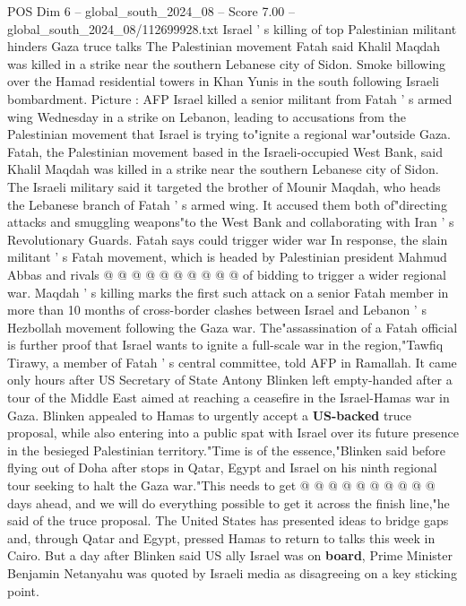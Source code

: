 \begin{textsample}{POS Dim 6 – global\_south\_2024\_08 – Score 7.00 – global\_south\_2024\_08/112699928.txt}  \label{ex:f6_pos_381}
Israel ' s killing of top Palestinian militant hinders Gaza truce talks The Palestinian movement Fatah said Khalil Maqdah was killed in a strike near the southern Lebanese city of Sidon.
Smoke billowing over the Hamad residential towers in Khan Yunis in the south following Israeli bombardment.
Picture : AFP Israel killed a senior militant from Fatah ' s armed wing Wednesday in a strike on Lebanon, leading to accusations from the Palestinian movement that Israel is trying to"ignite a regional war"outside Gaza.
Fatah, the Palestinian movement based in the Israeli-occupied West Bank, said Khalil Maqdah was killed in a strike near the southern Lebanese city of Sidon.
The Israeli military said it targeted the brother of Mounir Maqdah, who heads the Lebanese branch of Fatah ' s armed wing.
It accused them both of"directing attacks and smuggling weapons"to the West Bank and collaborating with Iran ' s Revolutionary Guards.
Fatah says could trigger wider war In response, the slain militant ' s Fatah movement, which is headed by Palestinian president Mahmud Abbas and rivals @ @ @ @ @ @ @ @ @ @ of bidding to trigger a wider regional war.
Maqdah ' s killing marks the first such attack on a senior Fatah member in more than 10 months of cross-border clashes between Israel and Lebanon ' s Hezbollah movement following the Gaza war.
The"assassination of a Fatah official is further proof that Israel wants to ignite a full-scale war in the region,"Tawfiq Tirawy, a member of Fatah ' s central committee, told AFP in Ramallah.
It came only hours after US Secretary of State Antony Blinken left empty-handed after a tour of the Middle East aimed at reaching a ceasefire in the Israel-Hamas war in Gaza.
Blinken appealed to Hamas to urgently accept a \textbf{US-backed} truce proposal, while also entering into a public spat with Israel over its future presence in the besieged Palestinian territory."Time is of the essence,"Blinken said before flying out of Doha after stops in Qatar, Egypt and Israel on his ninth regional tour seeking to halt the Gaza war."This needs to get @ @ @ @ @ @ @ @ @ @ days ahead, and we will do everything possible to get it across the finish line,"he said of the truce proposal.
The United States has presented ideas to bridge gaps and, through Qatar and Egypt, pressed Hamas to return to talks this week in Cairo.
But a day after Blinken said US ally Israel was on \textbf{board}, Prime Minister Benjamin Netanyahu was quoted by Israeli media as disagreeing on a key sticking point.

\end{textsample}
